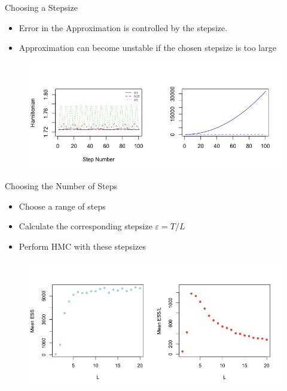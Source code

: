 \documentclass{beamer}
\begin{document}
\begin{frame}{Choosing a Stepsize}

\begin{itemize}

\item Error in the Approximation is controlled by the stepsize. \vskip 5mm

\item Approximation can become unstable if the chosen stepsize is too large \vskip 5mm
\end{itemize}

\begin{figure}
\includegraphics[scale = 0.3]{Leapfrog_Errors.jpeg}
\end{figure}

\end{frame}


\begin{frame}{Choosing the Number of Steps}

\begin{itemize}
\item Choose a range of steps \vskip 5mm

\item Calculate the corresponding stepsize $\varepsilon = T/L$ \vskip 5mm

\item Perform HMC with these stepsizes \vskip 5mm
\end{itemize}

\begin{figure}

\includegraphics[scale = 0.3]{Lvs_ESS.png}

\end{figure}

\end{frame}
\end{document}
